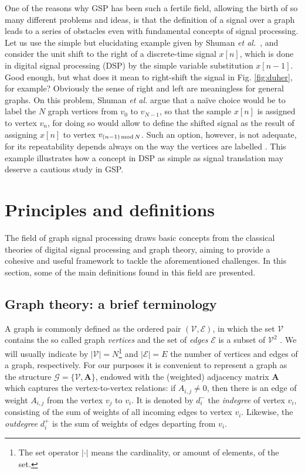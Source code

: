 One of the reasons why GSP has been such a fertile field, allowing the birth of so many different problems and ideas, is that the definition of a signal over a graph leads to a series of obstacles even with fundamental concepts of signal processing. Let us use the simple but elucidating example given by Shuman \emph{et al.}~\cite{shuman2013emerging}, and consider the unit shift to the right of a discrete-time signal $ x[n] $, which is done in digital signal processing (DSP) by the simple variable substitution $ x[n-1] $. Good enough, but what does it mean to right-shift the signal in  Fig. \ref{fig:duher}, for example? Obviously the sense of right and left are meaningless for general graphs. On this problem, Shuman \emph{et al.} argue that a na\"ive choice would be to label the $ N $ graph vertices from $ v_0 $ to $ v_{N-1} $, so that the sample $ x[n] $ is assigned to vertex $ v_n $, for doing so would allow to define the shifted signal as the result of assigning $ x[n] $ to vertex $ v_{(n-1) \text{\,mod\,} N} $. Such an option, however, is not adequate, for its repeatability depends always on the way the vertices are labelled \cite{shuman2013emerging}. This example illustrates how a concept in DSP as simple as signal translation may deserve a cautious study in GSP.


\section{Principles and definitions}
\label{sec:II}
The field of graph signal processing draws basic concepts from the classical theories of digital signal processing and graph theory, aiming to provide a cohesive and useful framework to tackle the aforementioned challenges. In this section, some of the main definitions found in this field are presented.


\subsection{Graph theory: a brief terminology}

A graph is commonly defined as the ordered pair  $ (\mathcal{V},\mathcal{E}) $, in which the set $ \mathcal{V} $ contains the so called graph \emph{vertices} and the set of \emph{edges} $ \mathcal{E} $ is a subset of $ \mathcal{V}^2 $ \cite{feofiloff2011introduccao}.  We will usually indicate by $ |\mathcal{V}| = N $\footnote{The set operator $ |\cdot| $ means the cardinality, or amount of elements, of the set.} and $ |\mathcal{E}| = E $ the number of vertices and edges of a graph, respectively. For our purposes it is convenient to represent a graph as the structure $ \mathcal{G} = \{\mathcal{V}, \mathbf{A}\} $, endowed with the (weighted) adjacency matrix $ \mathbf{A} $ which captures the vertex-to-vertex relations: if $ A_{i,j} \neq 0$, then there is an edge of weight $ A_{i,j} $ from the vertex $ v_j $ to $ v_i $. It is denoted by $ d_i^- $ the \emph{indegree} of vertex $ v_i $, consisting of the sum of weights of all incoming edges to vertex $ v_i $. Likewise, the \emph{outdegree} $ d^+_i $ is the sum of weights of edges departing from $ v_i $.

